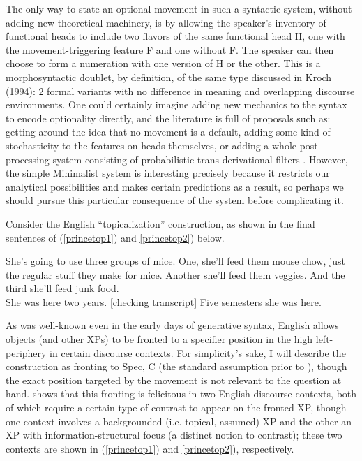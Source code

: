 The only way to state an optional movement in such a syntactic system, without adding new theoretical machinery, is by allowing the speaker's inventory of functional heads to include two flavors of the same functional head H, one with the movement-triggering feature F and one without F. The speaker can then choose to form a numeration with one version of H or the other. This is a morphosyntactic doublet, by definition, of the same type discussed in Kroch (1994): 2 formal variants with no difference in meaning and overlapping discourse environments. One could certainly imagine adding new mechanics to the syntax to encode optionality directly, and the literature is full of proposals such as: getting around the idea that no movement is a default, adding some kind of stochasticity to the features on heads themselves, or adding a whole post-processing system consisting of probabilistic trans-derivational filters . However, the simple Minimalist system is interesting precisely because it restricts our analytical possibilities and makes certain predictions as a result, so perhaps we should pursue this particular consequence of the system before complicating it.

Consider the English ``topicalization'' construction, as shown in the final sentences of (\ref{princetop1}) and \ref{princetop2}) below.

\begin{exe}
\ex \label{princetop1} She's going to use three groups of mice. One, she'll feed them mouse chow, just the regular stuff they make for
mice. Another she'll feed them veggies. And the third she'll feed junk food.\\

\ex \label{princetop2} She was here two years. [checking transcript] Five semesters she was here.\\
\citep[][8,9]{prince1999} 

\end{exe}

\noindent As was well-known even in the early days of generative syntax, English allows objects (and other XPs) to be fronted to a specifier position in the high left-periphery in certain discourse contexts. For simplicity's sake, I will describe the construction as fronting to Spec, C (the standard assumption prior to \citealt{rizzi1997}), though the exact position targeted by the movement is not relevant to the question at hand. \citet{prince1985,prince1998, prince1999} shows that this fronting is felicitous in two English discourse contexts, both of which require a certain type of contrast to appear on the fronted XP, though one context involves a backgrounded (i.e. topical, assumed) XP and the other an XP with information-structural focus (a distinct notion to contrast); these two contexts are shown in (\ref{princetop1}) and \ref{princetop2}), respectively.

